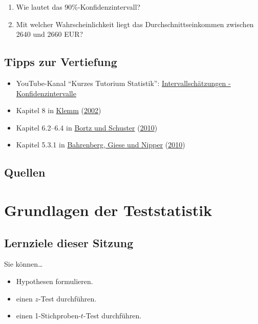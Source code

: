 \documentclass[
  ngerman,
]{article}
\providecommand{\tightlist}{%
  \setlength{\itemsep}{0pt}\setlength{\parskip}{0pt}}
\begin{document}
\begin{enumerate}
\def\labelenumi{\alph{enumi})}
\tightlist
\item
  Wie lautet das 90\%-Konfidenzintervall?
\item
  Mit welcher Wahrscheinlichkeit liegt das Durchschnittseinkommen zwischen 2640 und 2660 EUR?
\end{enumerate}

\hypertarget{tipps-zur-vertiefung-3}{%
\subsection{Tipps zur Vertiefung}\label{tipps-zur-vertiefung-3}}

\begin{itemize}
\tightlist
\item
  YouTube-Kanal ``Kurzes Tutorium Statistik'': \href{https://www.youtube.com/watch?v=DdwTa28W4Os}{Intervallschätzungen - Konfidenzintervalle}
\item
  Kapitel 8 in \protect\hyperlink{ref-klemm}{Klemm} (\protect\hyperlink{ref-klemm}{2002})
\item
  Kapitel 6.2--6.4 in \protect\hyperlink{ref-bortz}{Bortz und Schuster} (\protect\hyperlink{ref-bortz}{2010})
\item
  Kapitel 5.3.1 in \protect\hyperlink{ref-bahrenberg}{Bahrenberg, Giese und Nipper} (\protect\hyperlink{ref-bahrenberg}{2010})
\end{itemize}

\hypertarget{quellen-3}{%
\subsection{Quellen}\label{quellen-3}}

\hypertarget{grundlagen-der-teststatistik}{%
\section{Grundlagen der Teststatistik}\label{grundlagen-der-teststatistik}}

\hypertarget{lernziele-dieser-sitzung-4}{%
\subsection{Lernziele dieser Sitzung}\label{lernziele-dieser-sitzung-4}}

Sie können\ldots{}

\begin{itemize}
\tightlist
\item
  Hypothesen formulieren.
\item
  einen \(z\)-Test durchführen.
\item
  einen 1-Stichproben-\(t\)-Test durchführen.
\end{itemize}
\end{document}
